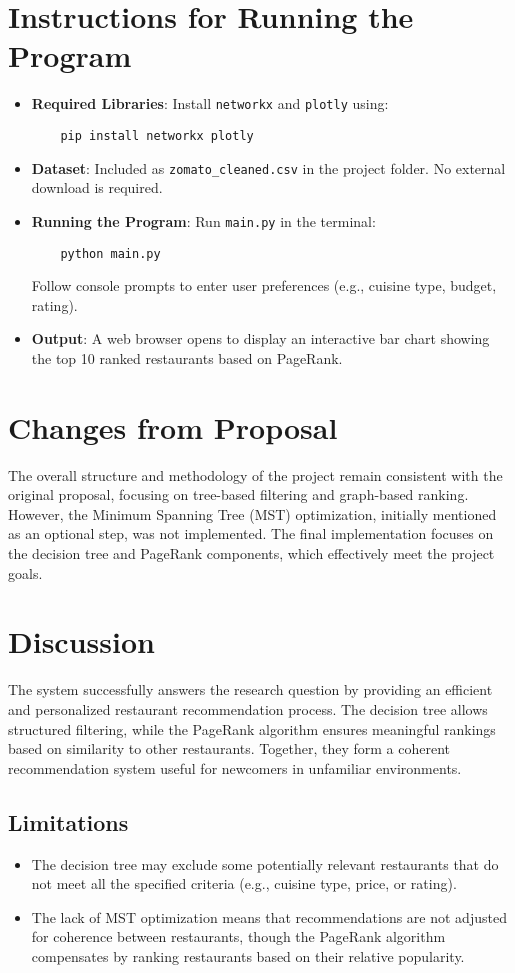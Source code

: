 \documentclass[fontsize=11pt]{article}
\begin{document}
\section*{Instructions for Running the Program}
\begin{itemize}
    \item \textbf{Required Libraries}: Install \texttt{networkx} and \texttt{plotly} using:
    \begin{verbatim}
    pip install networkx plotly
    \end{verbatim}
    \item \textbf{Dataset}: Included as \texttt{zomato\_cleaned.csv} in the project folder. No external download is required.
    \item \textbf{Running the Program}: Run \texttt{main.py} in the terminal:
    \begin{verbatim}
    python main.py
    \end{verbatim}
    Follow console prompts to enter user preferences (e.g., cuisine type, budget, rating).
    \item \textbf{Output}: A web browser opens to display an interactive bar chart showing the top 10 ranked restaurants based on PageRank.
\end{itemize}

\section*{Changes from Proposal}
The overall structure and methodology of the project remain consistent with the original proposal, focusing on tree-based filtering and graph-based ranking. However, the Minimum Spanning Tree (MST) optimization, initially mentioned as an optional step, was not implemented. The final implementation focuses on the decision tree and PageRank components, which effectively meet the project goals.

\section*{Discussion}
The system successfully answers the research question by providing an efficient and personalized restaurant recommendation process. The decision tree allows structured filtering, while the PageRank algorithm ensures meaningful rankings based on similarity to other restaurants. Together, they form a coherent recommendation system useful for newcomers in unfamiliar environments.
\subsection*{Limitations}
\begin{itemize}
    \item The decision tree may exclude some potentially relevant restaurants that do not meet all the specified criteria (e.g., cuisine type, price, or rating).
    \item The lack of MST optimization means that recommendations are not adjusted for coherence between restaurants, though the PageRank algorithm compensates by ranking restaurants based on their relative popularity.
\end{itemize}
\end{document}
